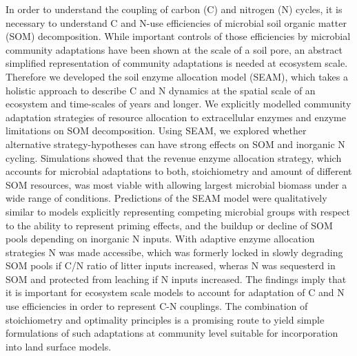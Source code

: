 In order to understand the coupling of carbon (C) and nitrogen (N) cycles, it is
necessary to understand C and N-use efficiencies of microbial soil organic
matter (SOM) decomposition. While important controls of those efficiencies by
microbial community adaptations have been shown at the scale of a soil pore, an
abstract simplified representation of community adaptations is needed at
ecosystem scale.
Therefore we developed the soil enzyme allocation model (SEAM), which takes a
holistic approach to describe C and N dynamics at the spatial scale of an
ecosystem and time-scales of years and longer.
We explicitly modelled community adaptation strategies of resource allocation to
extracellular enzymes and enzyme limitations on SOM decomposition. Using SEAM,
we explored whether alternative strategy-hypotheses can have strong effects on
SOM and inorganic N cycling.
Simulations showed that the revenue enzyme allocation strategy, which accounts
for microbial adaptations to both, stoichiometry and amount of different SOM
resources, was most viable with allowing largest microbial biomass under a wide
range of conditions.
Predictions of the SEAM model were qualitatively similar to models explicitly
representing competing microbial groups with respect to the ability to represent
priming effects, and the buildup or decline of SOM pools depending on inorganic
N inputs. With adaptive enzyme allocation strategies N was made accessibe, which
was formerly locked in slowly degrading SOM pools if C/N ratio of litter inputs
increased, wheras N was sequesterd in SOM and protected from leaching if N
inputs increased.
The findings imply that it is important for ecosystem scale models to account
for adaptation of C and N use efficiencies in order to represent C-N couplings.
The combination of stoichiometry and optimality principles is a promising route
to yield simple formulations of such adaptations at community level suitable for
incorporation into land surface models.

